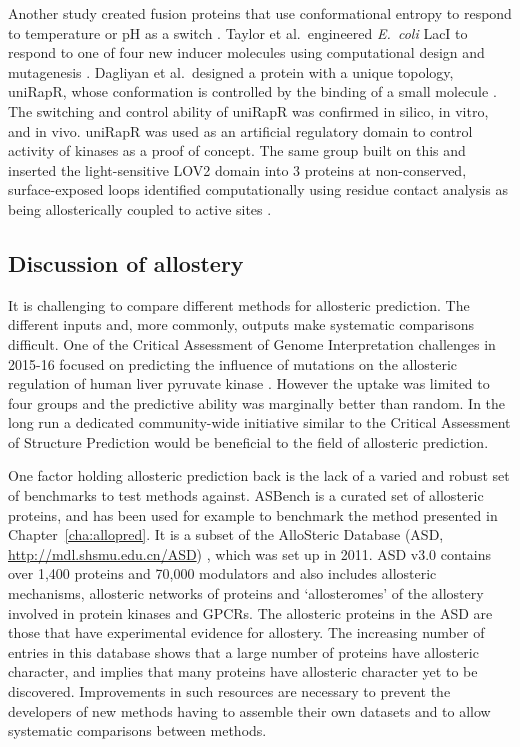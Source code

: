 Another study created fusion proteins that use conformational entropy to respond to temperature or pH as a switch \cite{Choi2015}.
Taylor et al.\ engineered \textit{E.\ coli} LacI to respond to one of four new inducer molecules using computational design and mutagenesis \cite{Taylor2016}.
Dagliyan et al.\ designed a protein with a unique topology, uniRapR, whose conformation is controlled by the binding of a small molecule \cite{Dagliyan2013}.
The switching and control ability of uniRapR was confirmed in silico, in vitro, and in vivo.
uniRapR was used as an artificial regulatory domain to control activity of kinases as a proof of concept.
The same group built on this and inserted the light-sensitive LOV2 domain into 3 proteins at non-conserved, surface-exposed loops identified computationally using residue contact analysis as being allosterically coupled to active sites \cite{Dagliyan2016}.


\subsection{Discussion of allostery}

It is challenging to compare different methods for allosteric prediction.
The different inputs and, more commonly, outputs make systematic comparisons difficult.
One of the Critical Assessment of Genome Interpretation challenges in 2015-16 focused on predicting the influence of mutations on the allosteric regulation of human liver pyruvate kinase \cite{Xu2017}.
However the uptake was limited to four groups and the predictive ability was marginally better than random.
In the long run a dedicated community-wide initiative similar to the Critical Assessment of Structure Prediction \cite{Moult2016} would be beneficial to the field of allosteric prediction.

One factor holding allosteric prediction back is the lack of a varied and robust set of benchmarks to test methods against.
ASBench \cite{Huang2015} is a curated set of allosteric proteins, and has been used for example to benchmark the method presented in Chapter~\ref{cha:allopred}.
It is a subset of the AlloSteric Database (ASD, \url{http://mdl.shsmu.edu.cn/ASD}) \cite{Shen2016}, which was set up in 2011.
ASD v3.0 contains over 1,400 proteins and 70,000 modulators and also includes allosteric mechanisms, allosteric networks of proteins and `allosteromes' of the allostery involved in protein kinases and GPCRs.
The allosteric proteins in the ASD are those that have experimental evidence for allostery.
The increasing number of entries in this database shows that a large number of proteins have allosteric character, and implies that many proteins have allosteric character yet to be discovered.
Improvements in such resources are necessary to prevent the developers of new methods having to assemble their own datasets \cite{Panjkovich2012, Mitternacht2011, Amor2016} and to allow systematic comparisons between methods.

